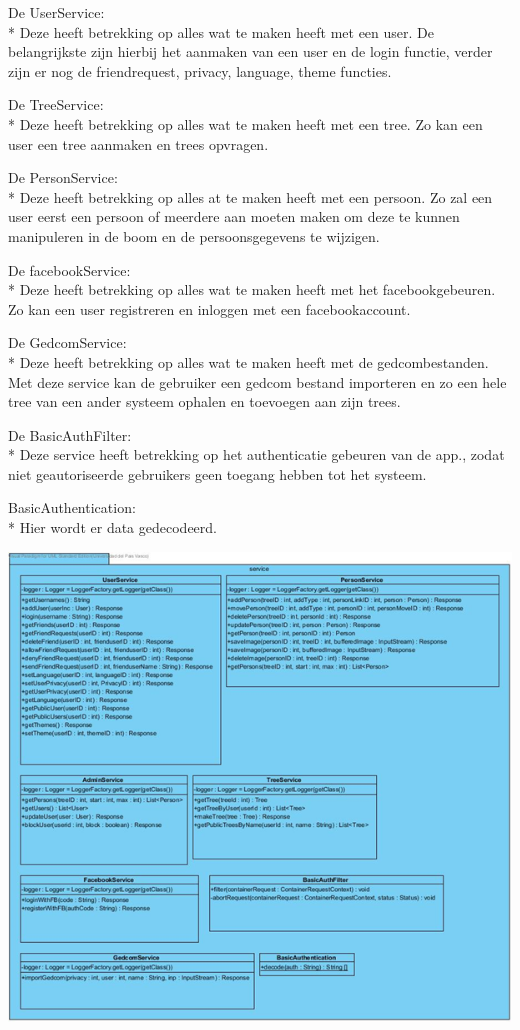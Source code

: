 \documentclass[pdftex,a4paper,12pt,twoside]{report}
\begin{document}
De UserService:\\*
Deze heeft betrekking op alles wat te maken heeft met een user.
De belangrijkste zijn hierbij het aanmaken van een user en de login functie, verder zijn er nog de friendrequest, privacy, language, theme functies.

De TreeService:\\*
Deze heeft betrekking op alles wat te maken heeft met een tree.
Zo kan een user een tree aanmaken en trees opvragen.

De PersonService:\\*
Deze heeft betrekking op alles at te maken heeft met een persoon.
Zo zal een user eerst een persoon of meerdere aan moeten maken om deze te kunnen manipuleren in de boom en de persoonsgegevens te wijzigen.

De facebookService:\\*
Deze heeft betrekking op alles wat te maken heeft met het facebookgebeuren.
Zo kan een user registreren en inloggen met een facebookaccount.

De GedcomService:\\*
Deze heeft betrekking op alles wat te maken heeft met de gedcombestanden.
Met deze service kan de gebruiker een gedcom bestand importeren en zo een hele tree van een ander systeem ophalen en toevoegen aan zijn trees.

De BasicAuthFilter:\\*
Deze service heeft betrekking op het authenticatie gebeuren van de app., zodat niet geautoriseerde gebruikers geen toegang hebben tot het systeem.

BasicAuthentication:\\*
Hier wordt er data gedecodeerd.

\includegraphics[width=\textwidth, height=\textheight]{images/DCDService.png}
\end{document}
